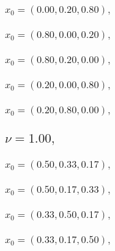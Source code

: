 \documentclass[a4paper]{article}
\begin{document}
\begin{multicols*}{2}
   \subsubsection{\(x_0 = (0.00,0.20,0.80),\quad \)}
   

   \subsubsection{\(x_0 = (0.80,0.00,0.20),\quad \)}
   

   \subsubsection{\(x_0 = (0.80,0.20,0.00),\quad \)}
   

   \subsubsection{\(x_0 = (0.20,0.00,0.80),\quad \)}
   

   \subsubsection{\(x_0 = (0.20,0.80,0.00),\quad \)}
   

   \subsection{\(\nu = 1.00,\quad \)}
   

   \subsubsection{\(x_0 = (0.50,0.33,0.17),\quad \)}
   

   \subsubsection{\(x_0 = (0.50,0.17,0.33),\quad \)}
   

   \subsubsection{\(x_0 = (0.33,0.50,0.17),\quad \)}
   

   \subsubsection{\(x_0 = (0.33,0.17,0.50),\quad \)}
   


\end{multicols*}
\end{document}
